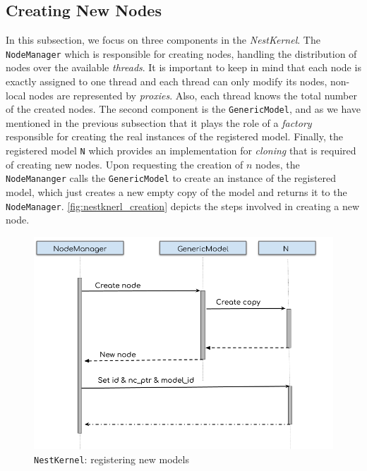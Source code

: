 \subsection{Creating New Nodes}

In this subsection, we focus on three components in the \emph{NestKernel}. The \texttt{NodeManager} which is responsible for creating nodes, handling the distribution of nodes over the available \emph{threads}.
It is important to keep in mind that each node is exactly assigned to one thread and each thread can only modify its nodes, non-local nodes are represented by \emph{proxies}. Also, each thread knows the total number of the created nodes. The second component
is the \texttt{GenericModel}, and as we have mentioned in the previous subsection that it plays the role of a \emph{factory} responsible for creating the real instances of the registered model. Finally, the registered model \texttt{N} which provides an implementation for \emph{cloning} that is required of creating new nodes.
Upon requesting the creation of $n$ nodes, the \texttt{NodeMananger} calls the \texttt{GenericModel} to create an instance of the registered model, which just creates a new empty copy of the model and returns it to the \texttt{NodeManager}. \autoref{fig:nestknerl_creation} depicts the steps involved in creating a new node.


\begin{figure}[ht!]
\centering
\includegraphics[width=1\textwidth,height=1\textheight,keepaspectratio]{src/pic/nodes_creation.png}
\caption{\texttt{NestKernel}: registering new models }
\label{fig:nestknerl_creation}
\end{figure}


